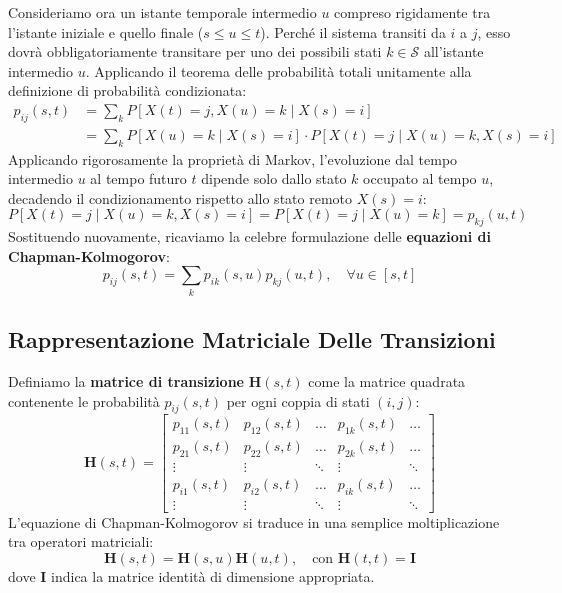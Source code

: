 \documentclass[11pt, a4paper]{article}
\begin{document}
Consideriamo ora un istante temporale intermedio $u$ compreso rigidamente tra l'istante iniziale e quello finale ($s \le u \le t$). Perché il sistema transiti da $i$ a $j$, esso dovrà obbligatoriamente transitare per uno dei possibili stati $k \in \mathcal{S}$ all'istante intermedio $u$. Applicando il teorema delle probabilità totali unitamente alla definizione di probabilità condizionata:
\begin{align*}
    p_{ij}(s, t) &= \sum_{k} P[X(t) = j, X(u) = k \mid X(s) = i] \\
    &= \sum_{k} P[X(u) = k \mid X(s) = i] \cdot P[X(t) = j \mid X(u) = k, X(s) = i]
\end{align*}
Applicando rigorosamente la proprietà di Markov, l'evoluzione dal tempo intermedio $u$ al tempo futuro $t$ dipende solo dallo stato $k$ occupato al tempo $u$, decadendo il condizionamento rispetto allo stato remoto $X(s) = i$:
\[
    P[X(t) = j \mid X(u) = k, X(s) = i] = P[X(t) = j \mid X(u) = k] = p_{kj}(u, t)
\]
Sostituendo nuovamente, ricaviamo la celebre formulazione delle \textbf{equazioni di Chapman-Kolmogorov}:
\[
    \boxed{p_{ij}(s, t) = \sum_{k} p_{ik}(s, u) p_{kj}(u, t), \quad \forall u \in [s, t]}
\]

\subsection{Rappresentazione Matriciale Delle Transizioni}

Definiamo la \textbf{matrice di transizione} $\bm{H}(s, t)$ come la matrice quadrata contenente le probabilità $p_{ij}(s, t)$ per ogni coppia di stati $(i, j)$:
\[
    \bm{H}(s, t) = \begin{bmatrix}
        p_{11}(s, t) & p_{12}(s, t) & \dots & p_{1k}(s, t) & \dots \\
        p_{21}(s, t) & p_{22}(s, t) & \dots & p_{2k}(s, t) & \dots \\
        \vdots & \vdots & \ddots & \vdots & \ddots \\
        p_{i1}(s, t) & p_{i2}(s, t) & \dots & p_{ik}(s, t) & \dots \\
        \vdots & \vdots & \ddots & \vdots & \ddots
    \end{bmatrix}
\]
L'equazione di Chapman-Kolmogorov si traduce in una semplice moltiplicazione tra operatori matriciali:
\[
    \boxed{\bm{H}(s, t) = \bm{H}(s, u) \bm{H}(u, t), \quad \text{con } \bm{H}(t, t) = \bm{I}}
\]
dove $\bm{I}$ indica la matrice identità di dimensione appropriata.

\newpage
\end{document}
